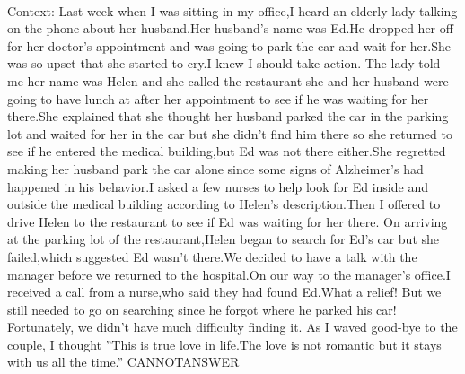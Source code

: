 \documentclass[11pt,a4paper, onecolumn]{article}
\begin{document}
\\ Context: Last week when I was sitting in my office,I heard an elderly lady talking on the phone about her husband.Her husband's name was Ed.He dropped her off for her doctor's appointment and was going to park the car and wait for her.She was so upset that she started to cry.I knew I should take action. The lady told me her name was Helen and she called the restaurant she and her husband were going to have lunch at after her appointment to see if he was waiting for her there.She explained that she thought her husband parked the car in the parking lot and waited for her in the car but she didn't find him there so she returned to see if he entered the medical building,but Ed was not there either.She regretted making her husband park the car alone since some signs of Alzheimer's had happened in his behavior.I asked a few nurses to help look for Ed inside and outside the medical building according to Helen's description.Then I offered to drive Helen to the restaurant to see if Ed was waiting for her there. On arriving at the parking lot of the restaurant,Helen began to search for Ed's car but she failed,which suggested Ed wasn't there.We decided to have a talk with the manager before we returned to the hospital.On our way to the manager's office.I received a call from a nurse,who said they had found Ed.What a relief! But we still needed to go on searching since he forgot where he parked his car! Fortunately, we didn't have much difficulty finding it. As I waved good-bye to the couple, I thought ''This is true love in life.The love is not romantic but it stays with us all the time.'' CANNOTANSWER
\end{document}
